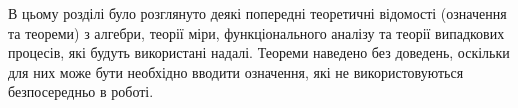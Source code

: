 В цьому розділі було розглянуто деякі попередні теоретичні
відомості (означення та теореми) з алгебри, теорії міри,
функціонального аналізу та теорії
випадкових процесів, які будуть використані
надалі. Теореми наведено без доведень, оскільки
для них може бути необхідно вводити означення, які не використовуються
безпосередньо в роботі.